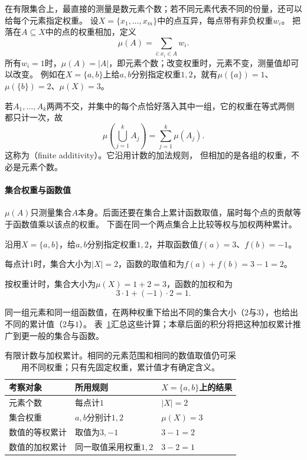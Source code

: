 在有限集合上，最直接的测量是数元素个数；若不同元素代表不同的份量，还可以给每个元素指定权重。
设$X=\{x_1,\ldots,x_m\}$中的点互异，每点带有非负权重$w_i$。
把落在$A\subseteq X$中的点的权重相加，定义
\[
 \mu(A)=\sum_{i:x_i\in A}w_i.
\]
所有$w_i=1$时，$\mu(A)=|A|$，即元素个数；改变权重时，元素不变，测量值却可以改变。
例如在$X=\{a,b\}$上给$a,b$分别指定权重$1,2$，就有$\mu(\{a\})=1$、$\mu(\{b\})=2$、$\mu(X)=3$。

若$A_1,\ldots,A_k$两两不交，并集中的每个点恰好落入其中一组，它的权重在等式两侧都只计一次，故
\[
 \mu\left(\bigcup_{j=1}^k A_j\right)=\sum_{j=1}^k\mu(A_j).
\]
这称为（finite additivity）。它沿用计数的加法规则，
但相加的是各组的权重，不必是元素个数。

\paragraph{集合权重与函数值}

$\mu(A)$只测量集合$A$本身。后面还要在集合上累计函数取值，届时每个点的贡献等于函数值乘以该点的权重。
下面在同一个两点集合上比较等权与加权两种累计。
\begin{example}[两点集合上的等权与加权累计]
沿用$X=\{a,b\}$，给$a,b$分别指定权重$1,2$，并取函数值$f(a)=3$、$f(b)=-1$。

每点计$1$时，集合大小为$|X|=2$，函数的取值和为$f(a)+f(b)=3-1=2$。

按权重计时，集合大小为$\mu(X)=1+2=3$，函数的加权和为
\[
 3\cdot1+(-1)\cdot2=1.
\]
\end{example}

同一组元素和同一组函数值，在两种权重下给出不同的集合大小（$2$与$3$），也给出不同的累计值（$2$与$1$）。
表~\ref{tab:analysis-metric-measure-integral}汇总这些计算；本章后面的积分将把这种加权累计推广到更一般的集合与函数。
\begin{table}[htbp]
 \centering\small
 \begin{tabularx}{\linewidth}{@{}lXX@{}}
 \toprule
 考察对象 & 所用规则 & $X=\{a,b\}$上的结果\\
 \midrule
 元素个数 & 每点计$1$ & $|X|=2$\\
 集合权重 & $a,b$分别计$1,2$ & $\mu(X)=3$\\
 数值的等权累计 & 取值为$3,-1$ & $3-1=2$\\
 数值的加权累计 & 同一取值采用权重$1,2$ & $3-2=1$\\
 \bottomrule
 \end{tabularx}
 \caption{有限计数与加权累计。相同的元素范围和相同的数值取值仍可采用不同权重；只有先固定权重，累计值才有确定含义。}
 \label{tab:analysis-metric-measure-integral}
\end{table}

